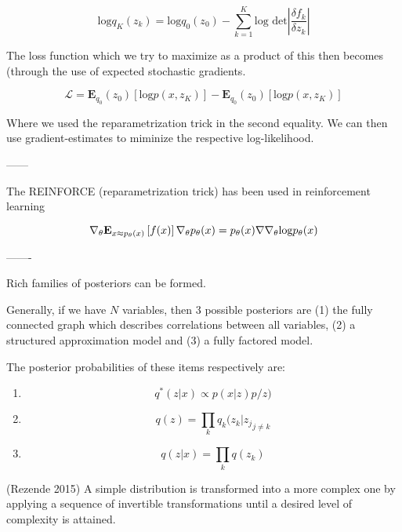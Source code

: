 \documentclass[a4paper,12pt,twoside,openright]{report}
\begin{document}
\begin{equation}
\text{log} q_K(z_k) = \text{log} q_0(z_0) - \sum_{k=1}^{K} \text{log det} \left| \frac{\delta f_k}{\delta z_k} \right|
\end{equation}

The loss function which we try to maximize as a product of this then becomes (through the use of expected stochastic gradients.

\begin{equation}
\mathcal{L} =  \mathbf{E}_{q_0}(z_0) \left[ \text{log} p(x, z_K) \right]- \mathbf{E}_{q_0}(z_0) \left[ \text{log} p(x, z_K) \right]
\end{equation}

%  

Where we used the reparametrization trick in the second equality. We can then use gradient-estimates to miminize the respective log-likelihood.


------

The REINFORCE (reparametrization trick) has been used in reinforcement learning

\begin{equation}
\nabla_\theta \mathbf{E}_{x \approx p_\theta(x)} \left[ f(x) \right] \\
\nabla_\theta p_\theta(x) = p_\theta(x) \nabla \nabla_\theta \text{log} p_\theta(x)
\end{equation}


-------

Rich families of posteriors can be formed.

Generally, if we have $N$ variables, then 3 possible posteriors are (1) the fully connected graph which describes correlations between all variables, (2) a structured approximation model and (3) a fully factored model.

The posterior probabilities of these items respectively are:

\begin{enumerate}
\item $$ q^* (z | x) \propto p(x|z)p/z)$$
\item $$ q(z) = \prod_k q_k(z_k | {z_j}_{j \neq k}  $$
\item $$ q(z|x) = \prod_k q(z_k) $$
\end{enumerate}

(Rezende 2015) A simple distribution is transformed into a more complex one by applying a sequence of invertible transformations until a desired level of complexity is attained.\\
\end{document}
